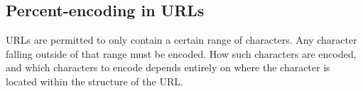\begin{Shaded}
\begin{Highlighting}[]
 \NormalTok{(}\OperatorTok{,}
  \OperatorTok{=}  \OperatorTok{,}  \NormalTok{(}\OperatorTok{,} \NormalTok{))}\OperatorTok{;}
   \OperatorTok{===} \NormalTok{) \{}
    \OperatorTok{,}\OperatorTok{,}\OperatorTok{=}\OperatorTok{;}
    \OperatorTok{+}\OperatorTok{+}\OperatorTok{;}
\NormalTok{  \}}
  \NormalTok{()}\OperatorTok{;}
\NormalTok{\}}

\NormalTok{(}\OperatorTok{,} \NormalTok{)}\OperatorTok{;}         
\NormalTok{(}\OperatorTok{,} \NormalTok{)}\OperatorTok{;}    
\NormalTok{(}\OperatorTok{,} \NormalTok{)}\OperatorTok{;} 
\end{Highlighting}
\end{Shaded}

\subsection{Percent-encoding in URLs}\label{percent-encoding-in-urls}

URLs are permitted to only contain a certain range of characters. Any
character falling outside of that range must be encoded. How such
characters are encoded, and which characters to encode depends entirely
on where the character is located within the structure of the URL.

